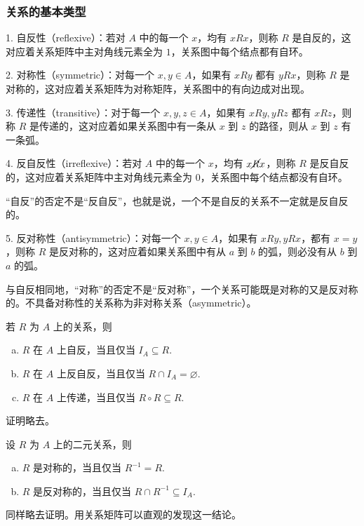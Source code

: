 \documentclass[normal,cyan]{elegantnote}
\begin{document}
\subsubsection{关系的基本类型}
1. 自反性（reflexive）：若对 $A$ 中的每一个 $x$，均有 $xRx$，则称 $R$ 是{\color{red}自反的}，这对应着关系矩阵中主对角线元素全为 $1$，关系图中每个结点都有自环。

2. 对称性（symmetric）：对每一个 $x, y \in A$，如果有 $xRy$ 都有 $yRx$，则称 $R$ 是{\color{red}对称的}，这对应着关系矩阵为对称矩阵，关系图中的有向边成对出现。

3. 传递性（transitive）：对于每一个 $x, y, z \in A$，如果有 $xRy, yRz$ 都有 $xRz$，则称 $R$ 是{\color{red}传递的}，这对应着如果关系图中有一条从 $x$ 到 $z$ 的{\color{red}路径}，则从 $x$ 到 $z$ 有一条弧。

4. 反自反性（irreflexive）：若对 $A$ 中的每一个 $x$，均有 $x\cancel{R}x$，则称 $R$ 是{\color{red}反自反的}，这对应着关系矩阵中主对角线元素全为 $0$，关系图中每个结点都没有自环。
\begin{note}
    “自反”的否定不是“反自反”，也就是说，一个不是自反的关系不一定就是反自反的。
\end{note}
5. 反对称性（antisymmetric）：对每一个 $x, y \in A$，如果有 $xRy, yRx$，都有 $x = y$，则称 $R$ 是{\color{red}反对称的}，这对应着如果关系图中有从 $a$ 到 $b$ 的弧，则必没有从 $b$ 到 $a$ 的弧。
\begin{note}
    与自反相同地，“对称”的否定不是“反对称”，一个关系可能既是对称的又是反对称的。不具备对称性的关系称为{\color{red}非对称关系}（asymmetric）。
\end{note}
\begin{theorem}
    若 $R$ 为 $A$ 上的关系，则
    \begin{enumerate}[a)]
        \item $R$ 在 $A$ 上自反，当且仅当 $I_A \subseteq R$.
        \item $R$ 在 $A$ 上反自反，当且仅当 $R \cap I_A = \varnothing$.
        \item $R$ 在 $A$ 上传递，当且仅当 $R \circ R \subseteq R$.
    \end{enumerate}
\end{theorem}
证明略去。
\begin{theorem}
    设 $R$ 为 $A$ 上的二元关系，则
    \begin{enumerate}[a)]
        \item $R$ 是对称的，当且仅当 $R^{-1} = R$.
        \item $R$ 是反对称的，当且仅当 $R \cap R^{-1} \subseteq I_A.$
    \end{enumerate}
\end{theorem}
同样略去证明。用关系矩阵可以直观的发现这一结论。
\end{document}
